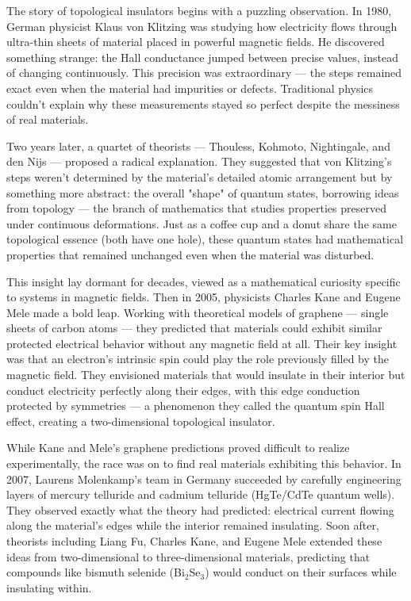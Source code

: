 \begin{historical}
The story of topological insulators begins with a puzzling observation. In 1980, German physicist Klaus von Klitzing was studying how electricity flows through ultra-thin sheets of material placed in powerful magnetic fields. He discovered something strange: the Hall conductance jumped between precise values, instead of changing continuously. This precision was extraordinary — the steps remained exact even when the material had impurities or defects. Traditional physics couldn't explain why these measurements stayed so perfect despite the messiness of real materials.

Two years later, a quartet of theorists — Thouless, Kohmoto, Nightingale, and den Nijs — proposed a radical explanation. They suggested that von Klitzing's steps weren't determined by the material's detailed atomic arrangement but by something more abstract: the overall "shape" of quantum states, borrowing ideas from topology — the branch of mathematics that studies properties preserved under continuous deformations. Just as a coffee cup and a donut share the same topological essence (both have one hole), these quantum states had mathematical properties that remained unchanged even when the material was disturbed.

This insight lay dormant for decades, viewed as a mathematical curiosity specific to systems in magnetic fields. Then in 2005, physicists Charles Kane and Eugene Mele made a bold leap. Working with theoretical models of graphene — single sheets of carbon atoms — they predicted that materials could exhibit similar protected electrical behavior without any magnetic field at all. Their key insight was that an electron's intrinsic spin could play the role previously filled by the magnetic field. They envisioned materials that would insulate in their interior but conduct electricity perfectly along their edges, with this edge conduction protected by symmetries — a phenomenon they called the quantum spin Hall effect, creating a two-dimensional topological insulator.

While Kane and Mele's graphene predictions proved difficult to realize experimentally, the race was on to find real materials exhibiting this behavior. In 2007, Laurens Molenkamp's team in Germany succeeded by carefully engineering layers of mercury telluride and cadmium telluride (HgTe/CdTe quantum wells). They observed exactly what the theory had predicted: electrical current flowing along the material's edges while the interior remained insulating. Soon after, theorists including Liang Fu, Charles Kane, and Eugene Mele extended these ideas from two-dimensional to three-dimensional materials, predicting that compounds like bismuth selenide (Bi$_2$Se$_3$) would conduct on their surfaces while insulating within.


\end{historical}
